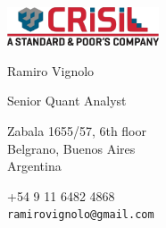 \documentclass{article}
\begin{document}
\AddToShipoutPicture{\BackgroundPic}


\vspace{0.5cm plus \chico minus \chico}

\begin{minipage}{0.3\linewidth}
\par\vspace{\chico}
\par\vspace{\chico}
\par\vspace{\chico}
\vspace{1cm}
\end{minipage}
\begin{minipage}{0.4\linewidth}

\begin{center}
\href{http://www.crisil.com}{\includegraphics[width=4.5cm]{logos/crisil-2}}\\

\smallskip

\textsf{Ramiro Vignolo}
\par
\textsf{Senior Quant Analyst}
\end{center}

\smallskip

\hspace{1.25cm}
\begin{minipage}{7cm}
Zabala 1655/57, 6th floor\\
Belgrano, Buenos Aires\\
Argentina
\end{minipage}

\begin{center}
+54 9 11 6482 4868\\
\textcolor{azul}{\texttt{ramirovignolo@gmail.com}}\\


\end{center}
\end{minipage}
\end{document}
